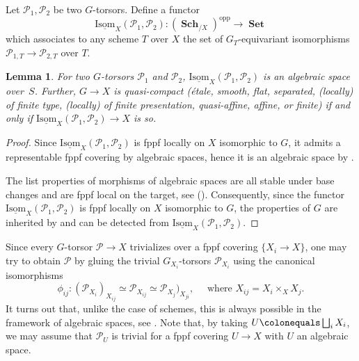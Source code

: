 \documentclass[JEP,XML,SOM,Unicode,published]{cedram}
\newcommand{\cP}{\mathcal{P}}
\let\un\underline
\let\ce\colonequals
\let\q\quad
\DeclareMathOperator{\Set}{\textbf{Set}}
\DeclareMathOperator{\Sch}{\textbf{Sch}}
\newcommand{\bpf}{\begin{proof}}
\newcommand{\epf}{\end{proof}}
\newcommand{\blemt}{\begin{lemma-tweak}}
\newcommand{\elemt}{\end{lemma-tweak}}
\providecommand{\SP}[1]{\cite[\href{https://stacks.math.columbia.edu/tag/#1}{#1}]{SP}}
\providecommand{\SPN}[9]{\cite[\href{https://stacks.math.columbia.edu/tag/#1}{#1}, \href{https://stacks.math.columbia.edu/tag/#2}{#2},
\href{https://stacks.math.columbia.edu/tag/#3}{#3},
\href{https://stacks.math.columbia.edu/tag/#4}{#4},
\href{https://stacks.math.columbia.edu/tag/#5}{#5},
\href{https://stacks.math.columbia.edu/tag/#6}{#6},
\href{https://stacks.math.columbia.edu/tag/#7}{#7},
\href{https://stacks.math.columbia.edu/tag/#8}{#8},
\href{https://stacks.math.columbia.edu/tag/#9}{#9}]{SP}}
\theoremstyle{plain}
\newtheorem{lemma-tweak}[subsection]{Lemma}
\theoremstyle{definition}
\begin{document}
Let $\cP_1,\cP_2$ be two $G$-torsors. Define a functor
\[
\un{\mathrm{Isom}}_X(\cP_1,\cP_2):(\Sch_{/X})^{\mathrm{opp}}\to \Set
\]
which associates to any scheme $T$ over $X$ the set of $G_T$-equivariant isomorphisms $\cP_{1,T} \to \cP_{2,T}$ over $T$.
\blemt \label{lem on Isom}
For two $G$-torsors $\cP_1$ and $\cP_2$, $\un{\mathrm{Isom}}_X(\cP_1,\cP_2)$ is an algebraic space over~$S$. Further, $G\to X$ is quasi-compact (\resp étale, smooth, flat, separated, (local\-ly) of finite type, (locally) of finite presentation, quasi-affine, affine, or finite) if and only if $\un{\mathrm{Isom}}_X(\cP_1,\cP_2)\to X$ is so.
\elemt
\bpf
Since $\un{\mathrm{Isom}}_{X}(\cP_1,\cP_2)$ is fppf locally on $X$ isomorphic to $G$, it admits a representable fppf covering by algebraic spaces, hence it is an algebraic space by \SP{04S6}.

The list properties of morphisms of algebraic spaces are all stable under base changes and are fppf local on the target, see \SP{03KG} (\resp \SPN{03XT}{03ZF}{03MM}{03KM}{040Y}{0410}{03WM}{03WG}{03ZQ}).
Consequently, since the functor $\un{\mathrm{Isom}}_{X}(\cP_1,\cP_2)$ is fppf locally on $X$ isomorphic to $G$, the properties of $G$ are inherited by and can be detected from $\un{\mathrm{Isom}}_{X}(\cP_1,\cP_2)$.
\epf

Since every $G$-torsor $\cP\to X$ trivializes over a fppf covering $\{X_i\to X\}$, one may try to obtain $\cP$ by gluing the trivial $G_{X_i}$-torsors $\cP_{X_i}$ using the canonical isomorphisms
\[
\phi_{ij}:(\cP_{X_i})_{X_{ij}} \simeq \cP_{X_{ij}} \simeq \cP_{X_j})_{X_{ji}}, \q \text{ where } X_{ij}=X_i\times_XX_j.
\]
It turns out that, unlike the case of schemes, this is always possible in the framework of algebraic spaces, see .
Note that, by taking $U\ce \bigsqcup_i X_i$, we may assume that $\cP_U$ is trivial for a fppf covering $U\to X$ with $U$ an algebraic space.
\end{document}
